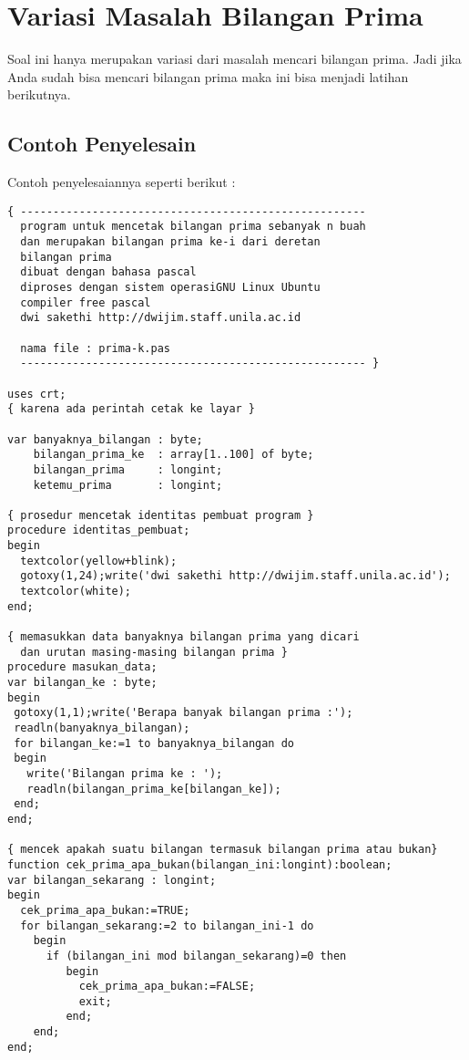 \documentclass[a4paper,10pt,makeidx]{article}
\begin{document}
\section{Variasi Masalah Bilangan Prima}
\par
\indent
\indent
Soal ini hanya merupakan variasi dari masalah mencari bilangan
prima. Jadi jika Anda sudah bisa mencari bilangan prima maka
ini bisa menjadi latihan berikutnya.
\subsection{Contoh Penyelesain}
\par
\indent
\indent
Contoh penyelesaiannya seperti berikut :
\begin{verbatim}
{ -----------------------------------------------------
  program untuk mencetak bilangan prima sebanyak n buah
  dan merupakan bilangan prima ke-i dari deretan 
  bilangan prima
  dibuat dengan bahasa pascal
  diproses dengan sistem operasiGNU Linux Ubuntu
  compiler free pascal 
  dwi sakethi http://dwijim.staff.unila.ac.id
  
  nama file : prima-k.pas
  ----------------------------------------------------- }

uses crt;
{ karena ada perintah cetak ke layar }

var banyaknya_bilangan : byte;
    bilangan_prima_ke  : array[1..100] of byte;
    bilangan_prima     : longint;
    ketemu_prima       : longint;

{ prosedur mencetak identitas pembuat program }
procedure identitas_pembuat;
begin
  textcolor(yellow+blink);
  gotoxy(1,24);write('dwi sakethi http://dwijim.staff.unila.ac.id');
  textcolor(white);
end;

{ memasukkan data banyaknya bilangan prima yang dicari
  dan urutan masing-masing bilangan prima }
procedure masukan_data;
var bilangan_ke : byte;
begin
 gotoxy(1,1);write('Berapa banyak bilangan prima :');
 readln(banyaknya_bilangan);
 for bilangan_ke:=1 to banyaknya_bilangan do
 begin
   write('Bilangan prima ke : ');
   readln(bilangan_prima_ke[bilangan_ke]);
 end;
end;

{ mencek apakah suatu bilangan termasuk bilangan prima atau bukan}
function cek_prima_apa_bukan(bilangan_ini:longint):boolean;
var bilangan_sekarang : longint;
begin
  cek_prima_apa_bukan:=TRUE;
  for bilangan_sekarang:=2 to bilangan_ini-1 do
    begin
      if (bilangan_ini mod bilangan_sekarang)=0 then 
         begin
           cek_prima_apa_bukan:=FALSE;
           exit;
         end;
    end;
end;


\end{verbatim}
\end{document}
